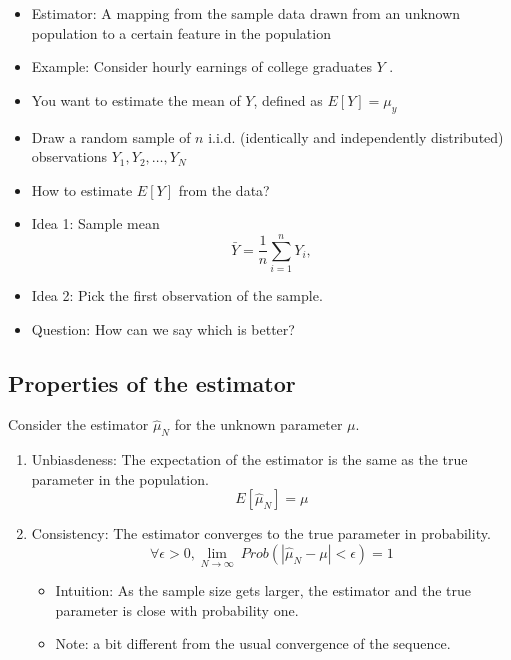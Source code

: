 \documentclass[]{book}
\providecommand{\tightlist}{%
  \setlength{\itemsep}{0pt}\setlength{\parskip}{0pt}}
\begin{document}
\begin{itemize}
\tightlist
\item
  Estimator: A mapping from the sample data drawn from an unknown population to a certain feature in the population
\item
  Example: Consider hourly earnings of college graduates \(Y\) .
\item
  You want to estimate the mean of \(Y\), defined as \(E[Y] = \mu_y\)
\item
  Draw a random sample of \(n\) i.i.d. (identically and independently distributed) observations \({ Y_1, Y_2, \ldots, Y_N }\)
\item
  How to estimate \(E[Y]\) from the data?
\item
  Idea 1: Sample mean
  \[ 
  \bar{Y} = \frac{1}{n} \sum_{i=1}^n Y_i, 
  \]
\item
  Idea 2: Pick the first observation of the sample.
\item
  Question: How can we say which is better?
\end{itemize}

\hypertarget{properties-of-the-estimator}{%
\subsection{Properties of the estimator}\label{properties-of-the-estimator}}

Consider the estimator \(\hat{\mu}_N\) for the unknown parameter \(\mu\).

\begin{enumerate}
\def\labelenumi{\arabic{enumi}.}
\item
  Unbiasdeness: The expectation of the estimator is the same as the true parameter in the population.
  \[
    E[\hat{\mu}_N] = \mu
  \]
\item
  Consistency: The estimator converges to the true parameter in probability.
  \[
  \forall \epsilon >0, \lim_{N \rightarrow \infty} \ Prob(|\hat{\mu}_{N}-\mu|<\epsilon)=1
  \]

  \begin{itemize}
  \tightlist
  \item
    Intuition: As the sample size gets larger, the estimator and the true parameter is close with probability one.
  \item
    Note: a bit different from the usual convergence of the sequence.
  \end{itemize}
\end{enumerate}
\end{document}
